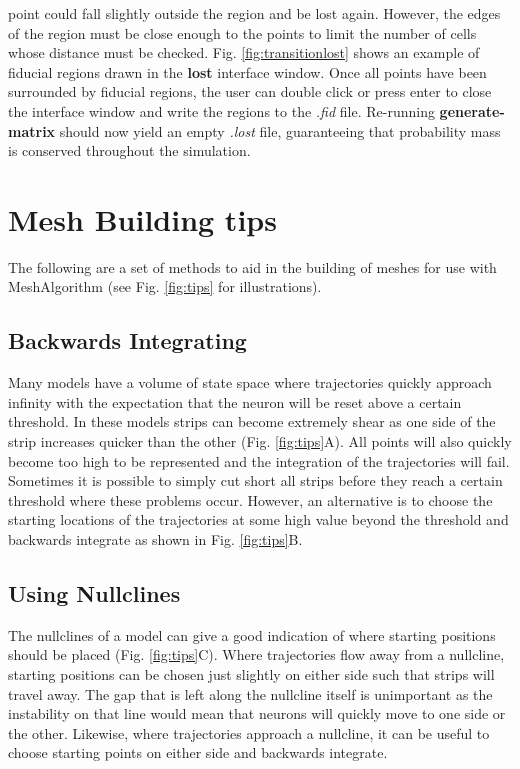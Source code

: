 \documentclass[utf8]{frontiers_suppmat} %
\begin{document}
point could fall slightly outside the region and be lost again. However, the edges of the region must be close enough to the points to limit the number of cells whose distance must be checked. Fig. \ref{fig:transitionlost} shows an example of fiducial regions drawn in the \textbf{lost} interface window. Once all points have been surrounded by fiducial regions, the user can double click or press enter to close the interface window and write the regions to the \textit{.fid} file. Re-running \textbf{generate-matrix} should now yield an empty \textit{.lost} file, guaranteeing that probability mass is conserved throughout the simulation.

\section{Mesh Building tips}
\label{meshtips}
The following are a set of methods to aid in the building of meshes for use with MeshAlgorithm (see Fig. \ref{fig:tips} for illustrations).\\
\subsection{Backwards Integrating}
Many models have a volume of state space where trajectories quickly approach infinity with the expectation that the neuron will be reset above a certain threshold. In these models strips can become extremely shear as one side of the strip increases quicker than the other (Fig. \ref{fig:tips}A). All points will also quickly become too high to be represented and the integration of the trajectories will fail. Sometimes it is possible to simply cut short all strips before they reach a certain threshold where these problems occur. However, an alternative is to choose the starting locations of the trajectories at some high value beyond the threshold and backwards integrate as shown in Fig. \ref{fig:tips}B.\\

\subsection{Using Nullclines}
The nullclines of a model can give a good indication of where starting positions should be placed (Fig. \ref{fig:tips}C). Where trajectories flow away from a nullcline, starting positions can be chosen just slightly on either side such that strips will travel away. The gap that is left along the nullcline itself is unimportant as the instability on that line would mean that neurons will quickly move to one side or the other. Likewise, where trajectories approach a nullcline, it can be useful to choose starting points on either side and backwards integrate.\\
\end{document}
